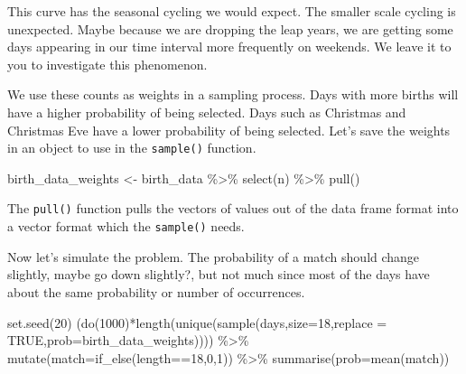 \documentclass[
  letterpaper,
  DIV=11,
  numbers=noendperiod]{scrreprt}
\newenvironment{Shaded}{\begin{snugshade}}{\end{snugshade}}
\newcommand{\AttributeTok}[1]{\textcolor[rgb]{0.40,0.45,0.13}{#1}}
\newcommand{\ConstantTok}[1]{\textcolor[rgb]{0.56,0.35,0.01}{#1}}
\newcommand{\DecValTok}[1]{\textcolor[rgb]{0.68,0.00,0.00}{#1}}
\newcommand{\FunctionTok}[1]{\textcolor[rgb]{0.28,0.35,0.67}{#1}}
\newcommand{\NormalTok}[1]{\textcolor[rgb]{0.00,0.23,0.31}{#1}}
\newcommand{\OtherTok}[1]{\textcolor[rgb]{0.00,0.23,0.31}{#1}}
\newcommand{\SpecialCharTok}[1]{\textcolor[rgb]{0.37,0.37,0.37}{#1}}
\begin{document}
This curve has the seasonal cycling we would expect. The smaller scale
cycling is unexpected. Maybe because we are dropping the leap years, we
are getting some days appearing in our time interval more frequently on
weekends. We leave it to you to investigate this phenomenon.

We use these counts as weights in a sampling process. Days with more
births will have a higher probability of being selected. Days such as
Christmas and Christmas Eve have a lower probability of being selected.
Let's save the weights in an object to use in the \texttt{sample()}
function.

\begin{Shaded}
\begin{Highlighting}[]
\NormalTok{birth\_data\_weights }\OtherTok{\textless{}{-}}\NormalTok{ birth\_data }\SpecialCharTok{\%\textgreater{}\%}
  \FunctionTok{select}\NormalTok{(n) }\SpecialCharTok{\%\textgreater{}\%}
  \FunctionTok{pull}\NormalTok{()}
\end{Highlighting}
\end{Shaded}

The \texttt{pull()} function pulls the vectors of values out of the data
frame format into a vector format which the \texttt{sample()} needs.

Now let's simulate the problem. The probability of a match should change
slightly, maybe go down slightly?, but not much since most of the days
have about the same probability or number of occurrences.

\begin{Shaded}
\begin{Highlighting}[]
\FunctionTok{set.seed}\NormalTok{(}\DecValTok{20}\NormalTok{)}
\NormalTok{(}\FunctionTok{do}\NormalTok{(}\DecValTok{1000}\NormalTok{)}\SpecialCharTok{*}\FunctionTok{length}\NormalTok{(}\FunctionTok{unique}\NormalTok{(}\FunctionTok{sample}\NormalTok{(days,}\AttributeTok{size=}\DecValTok{18}\NormalTok{,}\AttributeTok{replace =} \ConstantTok{TRUE}\NormalTok{,}\AttributeTok{prob=}\NormalTok{birth\_data\_weights)))) }\SpecialCharTok{\%\textgreater{}\%}
  \FunctionTok{mutate}\NormalTok{(}\AttributeTok{match=}\FunctionTok{if\_else}\NormalTok{(length}\SpecialCharTok{==}\DecValTok{18}\NormalTok{,}\DecValTok{0}\NormalTok{,}\DecValTok{1}\NormalTok{)) }\SpecialCharTok{\%\textgreater{}\%}
  \FunctionTok{summarise}\NormalTok{(}\AttributeTok{prob=}\FunctionTok{mean}\NormalTok{(match))}
\end{Highlighting}
\end{Shaded}
\end{document}
